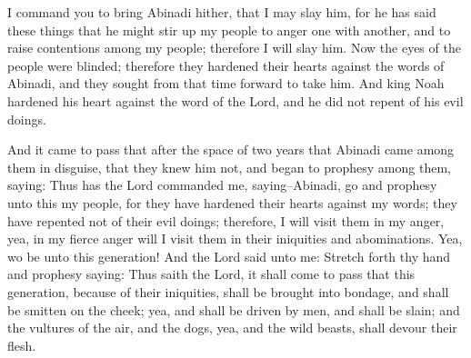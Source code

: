 I command you to bring Abinadi hither, that I may slay him, for he has said these things that he might stir up my people to anger one with another, and to raise contentions among my people; therefore I will slay him.
\bverse \iffalse Now the eyes of the people were blinded; therefore they hardened their hearts against the words of Abinadi, and they sought from that time forward to take him. And king Noah hardened his heart against the word of the Lord, and he did not repent of his evil doings. \fi
Now the eyes of the people were blinded; therefore they hardened their hearts against the words of Abinadi, and they sought from that time forward to take him. And king Noah hardened his heart against the word of the Lord, and he did not repent of his evil doings.

\bchapter
\bverse \iffalse And it came to pass that after the space of two years that Abinadi came among them in disguise, that they knew him not, and began to prophesy among them, saying: Thus has the Lord commanded me, saying--Abinadi, go and prophesy unto this my people, for they have hardened their hearts against my words; they have repented not of their evil doings; therefore, I will visit them in my anger, yea, in my fierce anger will I visit them in their iniquities and abominations. \fi
And it came to pass that after the space of two years that Abinadi came among them in disguise, that they knew him not, and began to prophesy among them, saying: Thus has the Lord commanded me, saying--Abinadi, go and prophesy unto this my people, for they have hardened their hearts against my words; they have repented not of their evil doings; therefore, I will visit them in my anger, yea, in my fierce anger will I visit them in their iniquities and abominations.
\bverse \iffalse Yea, wo be unto this generation! And the Lord said unto me: Stretch forth thy hand and prophesy saying: Thus saith the Lord, it shall come to pass that this generation, because of their iniquities, shall be brought into bondage, and shall be smitten on the cheek; yea, and shall be driven by men, and shall be slain; and the vultures of the air, and the dogs, yea, and the wild beasts, shall devour their flesh. \fi
Yea, wo be unto this generation! And the Lord said unto me: Stretch forth thy hand and prophesy saying: Thus saith the Lord, it shall come to pass that this generation, because of their iniquities, shall be brought into bondage, and shall be smitten on the cheek; yea, and shall be driven by men, and shall be slain; and the vultures of the air, and the dogs, yea, and the wild beasts, shall devour their flesh.
